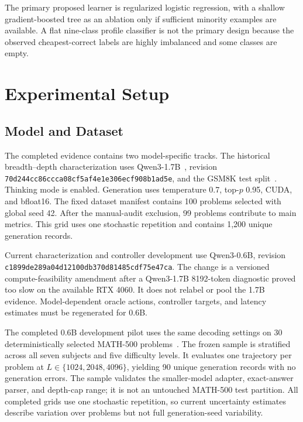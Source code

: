 \documentclass[runningheads]{llncs}
\begin{document}
The primary proposed learner is regularized logistic regression, with a shallow
gradient-boosted tree as an ablation only if sufficient minority examples are
available. A flat nine-class profile classifier is not the primary design
because the observed cheapest-correct labels are highly imbalanced and some
classes are empty.

\section{Experimental Setup}

\subsection{Model and Dataset}

The completed evidence contains two model-specific tracks. The historical
breadth--depth characterization uses Qwen3-1.7B~\cite{qwen3report}, revision
\texttt{70d244cc86ccca08cf5af4e1e306ecf908b1ad5e}, and the GSM8K test
split~\cite{cobbe2021gsm8k}. Thinking mode is enabled. Generation uses
temperature 0.7, top-$p$ 0.95, CUDA, and bfloat16. The fixed dataset manifest
contains 100 problems selected with global seed 42. After the manual-audit
exclusion, 99 problems contribute to main metrics. This grid uses one
stochastic repetition and contains 1,200 unique generation records.

Current characterization and controller development use Qwen3-0.6B, revision
\texttt{c1899de289a04d12100db370d81485cdf75e47ca}. The change is a versioned
compute-feasibility amendment after a Qwen3-1.7B 8192-token diagnostic proved
too slow on the available RTX 4060. It does not relabel or pool the 1.7B
evidence. Model-dependent oracle actions, controller targets, and latency
estimates must be regenerated for 0.6B.

The completed 0.6B development pilot uses the same decoding settings on 30
deterministically selected MATH-500 problems~\cite{hendrycks2021math}. The
frozen sample is stratified across all seven subjects and five difficulty
levels. It evaluates one trajectory per problem at
$L\in\{1024,2048,4096\}$, yielding 90 unique generation records with no
generation errors. The sample validates the smaller-model adapter,
exact-answer parser, and depth-cap range; it is not an untouched MATH-500 test
partition. All completed grids use one stochastic repetition, so current
uncertainty estimates describe variation over problems but not full
generation-seed variability.
\end{document}
